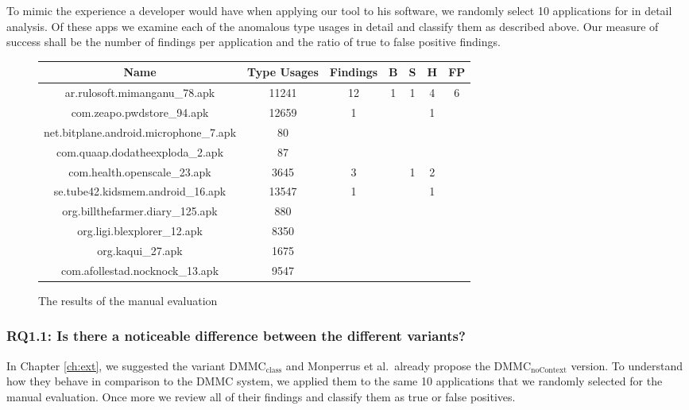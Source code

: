 To mimic the experience a developer would have when applying our tool to his software, we randomly select 10 applications for in detail analysis.
Of these apps we examine each of the anomalous type usages in detail and classify them as described above.
Our measure of success shall be the number of findings per application and the ratio of true to false positive findings.


\begin{figure}[t]
    \centering
    \begin{tabular}[h]{c|c|c|c|c|c|c}
\toprule
Name & Type Usages & Findings & B & S & H & FP \\
\midrule
ar.rulosoft.mimanganu\_78.apk 			& 11241  & 12 & 1 & 1 & 4 & 6 \\
com.zeapo.pwdstore\_94.apk 				& 12659  & 1  &   &   & 1 &   \\
net.bitplane.android.microphone\_7.apk 	& 80     &    &   &   &   &   \\
com.quaap.dodatheexploda\_2.apk			& 87     &    &   &   &   &   \\
com.health.openscale\_23.apk 			& 3645   & 3  &   & 1 & 2 &   \\
se.tube42.kidsmem.android\_16.apk 		& 13547  & 1  &   &   & 1 &   \\
org.billthefarmer.diary\_125.apk 		& 880    &    &   &   &   &   \\
org.ligi.blexplorer\_12.apk 			& 8350   &    &   &   &   &   \\
org.kaqui\_27.apk						& 1675   &    &   &   &   &   \\
com.afollestad.nocknock\_13.apk 		& 9547   &    &   &   &   &   \\
\bottomrule
    \end{tabular}
    \caption{The results of the manual evaluation}\label{fig:manual}
\end{figure}

\subsubsection{RQ1.1: Is there a noticeable difference between the different variants?}

In Chapter \ref{ch:ext}, we suggested the variant $\text{DMMC}_\text{class}$ and Monperrus et al.\ already propose the $\text{DMMC}_\text{noContext}$ version.
To understand how they behave in comparison to the $\text{DMMC}$ system, we applied them to the same 10 applications that we randomly selected for the manual evaluation.
Once more we review all of their findings and classify them as true or false positives.

